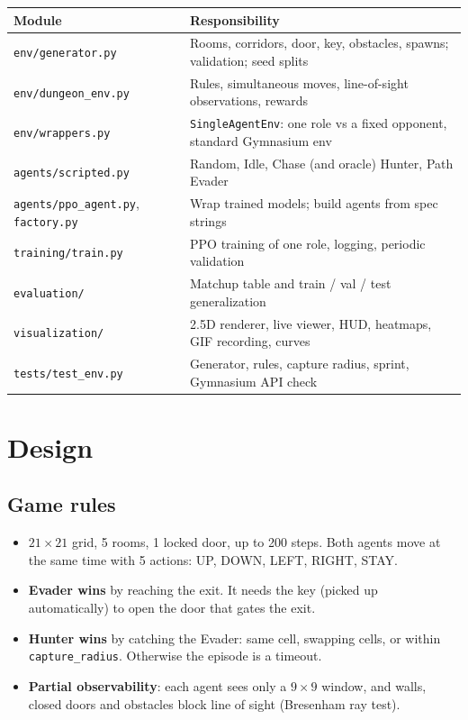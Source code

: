 \documentclass[11pt,a4paper]{article}
\newcommand{\code}[1]{\texttt{#1}}
\begin{document}
\begin{center}
\begin{tabularx}{\textwidth}{lX}
\toprule
\textbf{Module} & \textbf{Responsibility}\\
\midrule
\code{env/generator.py} & Rooms, corridors, door, key, obstacles, spawns; validation; seed splits\\
\code{env/dungeon\_env.py} & Rules, simultaneous moves, line-of-sight observations, rewards\\
\code{env/wrappers.py} & \code{SingleAgentEnv}: one role vs a fixed opponent, standard Gymnasium env\\
\code{agents/scripted.py} & Random, Idle, Chase (and oracle) Hunter, Path Evader\\
\code{agents/ppo\_agent.py}, \code{factory.py} & Wrap trained models; build agents from spec strings\\
\code{training/train.py} & PPO training of one role, logging, periodic validation\\
\code{evaluation/} & Matchup table and train / val / test generalization\\
\code{visualization/} & 2.5D renderer, live viewer, HUD, heatmaps, GIF recording, curves\\
\code{tests/test\_env.py} & Generator, rules, capture radius, sprint, Gymnasium API check\\
\bottomrule
\end{tabularx}
\end{center}

\section{Design}

\subsection{Game rules}
\begin{itemize}
  \item $21\times21$ grid, 5 rooms, 1 locked door, up to 200 steps. Both agents move at the same
        time with 5 actions: UP, DOWN, LEFT, RIGHT, STAY.
  \item \textbf{Evader wins} by reaching the exit. It needs the key (picked up automatically) to
        open the door that gates the exit.
  \item \textbf{Hunter wins} by catching the Evader: same cell, swapping cells, or within
        \code{capture\_radius}. Otherwise the episode is a timeout.
  \item \textbf{Partial observability}: each agent sees only a $9\times9$ window, and walls, closed
        doors and obstacles block line of sight (Bresenham ray test).
\end{itemize}
\end{document}

